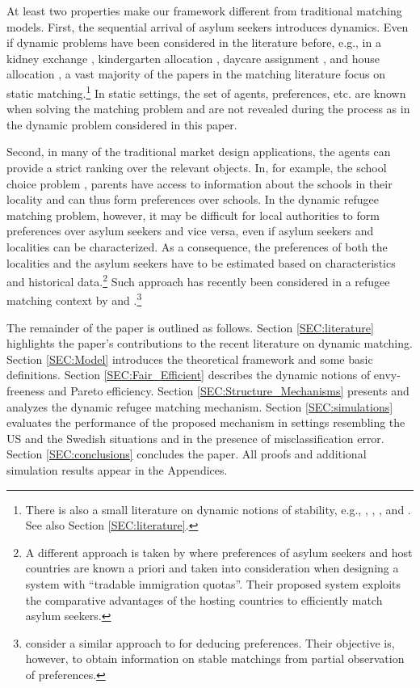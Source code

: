 \documentclass[12pt,fleqn]{article}
\begin{document}
At least two properties make our framework different from traditional matching models. First, the sequential arrival of asylum seekers introduces dynamics. Even if dynamic problems have been considered in the literature before, e.g., in a kidney exchange \citep{bib:Unver}, kindergarten allocation \citep{bib:KennesEtAl2014}, daycare assignment \citep{bib:KennesEtAl2014}, and house allocation \citep{bib:BlochCantala,bib:Kurino}, a vast majority of the papers in the matching literature focus on static matching.\footnote{There is also a small literature on dynamic notions of stability, e.g., \citet{bib:DamianoLam}, \citet{bib:Gudmundsson}, \citet{bib:KadamEtAl2018b}, and \citet{bib:Kurino}. See also Section \ref{SEC:literature}.} In static settings, the set of agents, preferences, etc. are known when solving the matching problem and are not revealed during the process as in the dynamic problem considered in this paper.

Second, in many of the traditional market design applications, the agents can provide a strict ranking over the relevant objects. In, for example, the school choice problem \citep{bib:AbdulkadirougluSonmez}, parents have access to information about the schools in their locality and can thus form preferences over schools. In the dynamic refugee matching problem, however, it may be difficult for local authorities to form preferences over asylum seekers and vice versa, even if asylum seekers and localities can be characterized. As a consequence, the preferences of both the localities and the asylum seekers have to be estimated based on characteristics and historical data.\footnote{A different approach is taken by \citet{bib:MoragaEtAl} where preferences of asylum seekers and host countries are known a priori and taken into consideration when designing a system with ``tradable immigration quotas''. Their proposed system exploits the comparative advantages of the hosting countries to efficiently match asylum seekers.} Such approach has recently been considered in a refugee matching context by \citet{bib:AnderssonEhlers} and \citet{bib:BansakEtAl}.\footnote{\citet{bib:HaeringerIehle} consider a similar approach to \citet{bib:AnderssonEhlers} for deducing preferences. Their objective is, however, to obtain information on stable matchings from partial observation of preferences.}

The remainder of the paper is outlined as follows. Section \ref{SEC:literature} highlights the paper's contributions to the recent literature on dynamic matching. Section \ref{SEC:Model} introduces the theoretical framework and some basic definitions. Section \ref{SEC:Fair_Efficient} describes the dynamic notions of envy-freeness and Pareto efficiency. Section \ref{SEC:Structure_Mechanisms} presents and analyzes the dynamic refugee matching mechanism. Section \ref{SEC:simulations} evaluates the performance of the proposed mechanism in settings resembling the US and the Swedish situations and in the presence of misclassification error. Section \ref{SEC:conclusions} concludes the paper. All proofs and additional simulation results appear in the Appendices.
\end{document}
